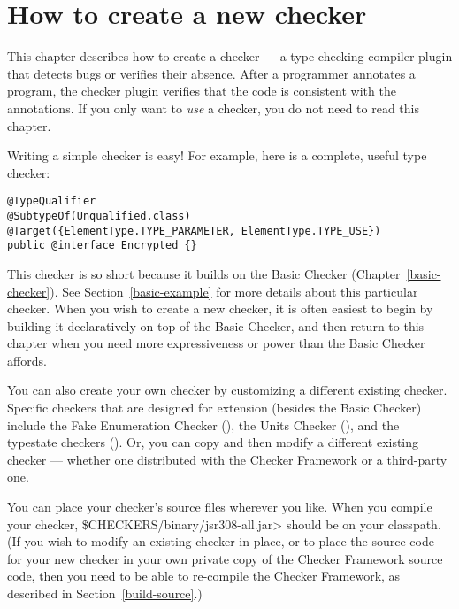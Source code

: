 \htmlhr
\chapter{How to create a new checker\label{writing-a-checker}}

\newcommand{\TreeAPIBase}{http://docs.oracle.com/javase/7/docs/jdk/api/javac/tree/com/sun/source}
\newcommand{\refTreeclass}[2]{\ahref{\TreeAPIBase{}/#1/#2.html?is-external=true}{\<#2>}}
\newcommand{\ModelAPIBase}{http://docs.oracle.com/javase/7/docs/api/javax/lang/model}
\newcommand{\refModelclass}[2]{\ahref{\ModelAPIBase{}/#1/#2.html?is-external=true}{\<#2>}}

This chapter describes how to create a checker
--- a type-checking compiler plugin that detects bugs or verifies their
absence.  After a programmer annotates a program,
the checker plugin verifies that the code is consistent
with the annotations.
If you only want to \emph{use} a checker, you do not need to read this
chapter.

Writing a simple checker is easy!  For example, here is a complete, useful
type checker:

\begin{Verbatim}
@TypeQualifier
@SubtypeOf(Unqualified.class)
@Target({ElementType.TYPE_PARAMETER, ElementType.TYPE_USE})
public @interface Encrypted {}
\end{Verbatim}

This checker is so short because it builds on the Basic Checker
(Chapter~\ref{basic-checker}).
See Section~\ref{basic-example} for more details about this particular checker.
When you wish to create a new checker, it is often easiest to begin by
building it declaratively on top of the Basic Checker, and then return to
this chapter when you need more expressiveness or power than the Basic
Checker affords.

You can also create your own checker by customizing a different existing
checker.  Specific checkers that are designed for extension (besides the Basic
Checker) include the Fake Enumeration Checker
(), the Units Checker
(), and the typestate checkers
().
Or, you can copy and then modify a different existing checker --- whether
one distributed with the Checker Framework or a third-party one.

You can place your checker's source files wherever you like.  When you
compile your checker, \<\$CHECKERS/binary/jsr308-all.jar> should be on your
classpath.  (If you wish to modify an existing checker in place, or to
place the source code for your new checker in your own private copy of the
Checker Framework source code, then you need to be able to re-compile the
Checker Framework, as described in Section~\ref{build-source}.)

